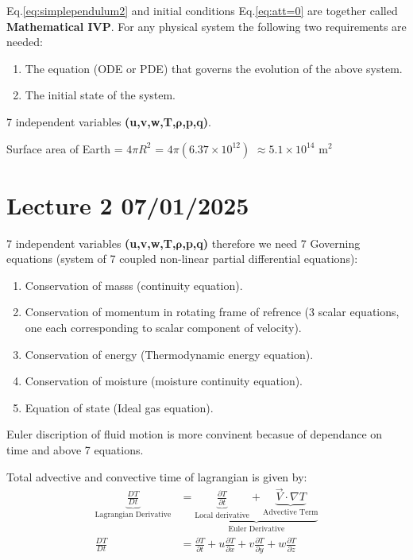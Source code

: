 \documentclass[fleqn,10pt]{SelfArx} %
\begin{document}
Eq.\eqref{eq:simplependulum2} and initial conditions Eq.\eqref{eq:att=0} are together called \textbf{Mathematical IVP}. For any physical system the following two requirements are needed:
\begin{enumerate}[noitemsep]
	\item The equation (ODE or PDE) that governs the evolution of the above system.
	\item The initial state of the system.
\end{enumerate}

7 independent variables \textbf{(u,v,w,T,$\boldsymbol{\rho}$,p,q)}.

Surface area of Earth = $4\pi R^2$ = $4\pi (6.37 \times 10^{12})$ $\approx 5.1 \times 10^{14}$ m$^2$

\section{Lecture 2 07/01/2025}
7 independent variables \textbf{(u,v,w,T,$\boldsymbol{\rho}$,p,q)} therefore we need 7 Governing equations (system of 7 coupled non-linear partial differential equations):
\begin{enumerate}[noitemsep]
	\item Conservation of masss (continuity equation).
	\item Conservation of momentum in rotating frame of refrence (3 scalar equations, one each corresponding to scalar component of velocity).
	\item Conservation of energy (Thermodynamic energy equation).
	\item Conservation of moisture (moisture continuity equation).
	\item Equation of state (Ideal gas equation).
\end{enumerate}

Euler discription of fluid motion is more convinent becasue of dependance on time and above 7 equations.

Total advective and convective time of lagrangian is given by:
\begin{align*}
  \underbrace{\frac{DT}{Dt}}_\text{Lagrangian Derivative} &= \underbrace{\underbrace{\frac{\partial T}{\partial t}}_\text{Local derivative} + \underbrace{\vec{V}\cdot \nabla T}_\text{Advective Term}}_\text{Euler Derivative} \\
  \frac{DT}{Dt} &= \frac{\partial T}{\partial t} + u\frac{\partial T}{\partial x} + v\frac{\partial T}{\partial y} + w\frac{\partial T}{\partial z} \tag{5} \label{eq:lageuleq}
\end{align*}


\end{document}
